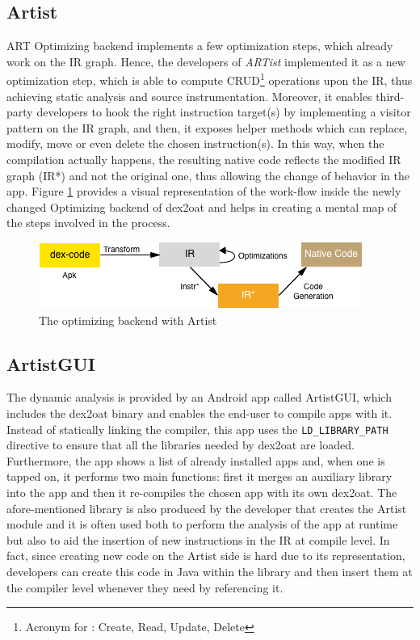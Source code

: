\subsection{Artist}
\label{sec:artist}
ART Optimizing backend implements a few optimization steps, which already work on the IR graph. Hence, the developers of \emph{ARTist} implemented it as a new optimization step, which is able to compute CRUD\footnote{Acronym for : Create, Read, Update, Delete} operations upon the IR, thus achieving static analysis and source instrumentation. Moreover, it enables third-party developers to hook the right instruction target(s) by implementing a visitor pattern on the IR graph, and then, it exposes helper methods which can replace, modify, move or even delete the chosen instruction(s). In this way, when the compilation actually happens, the resulting native code reflects the modified IR graph (IR*) and not the original one, thus allowing the change of behavior in the app. Figure \ref{fig:optbackend} provides a visual representation of the work-flow inside the newly changed Optimizing backend of dex2oat and helps in creating a mental map of the steps involved in the process.

\begin{figure}[H]
	\centering
	\includegraphics{img/dex2oat.png}
	\caption{The optimizing backend with Artist}
	\label{fig:optbackend}
\end{figure}

\subsection{ArtistGUI}
The dynamic analysis is provided by an Android app called ArtistGUI, which includes the dex2oat binary and enables the end-user to compile apps with it. Instead of statically linking the compiler, this app uses the \texttt{LD\_LIBRARY\_PATH} directive to ensure that all the libraries needed by dex2oat are loaded. Furthermore, the app shows a list of already installed apps and, when one is tapped on, it performs two main functions: first it merges an auxiliary library into the app and then it re-compiles the chosen app with its own dex2oat. The afore-mentioned library is also produced by the developer that creates the Artist module and it is often used both to perform the analysis of the app at runtime but also to aid the insertion of new instructions in the IR at compile level. In fact, since creating new code on the Artist side is hard due to its representation, developers can create this code in Java within the library and then insert them at the compiler level whenever they need by referencing it.

